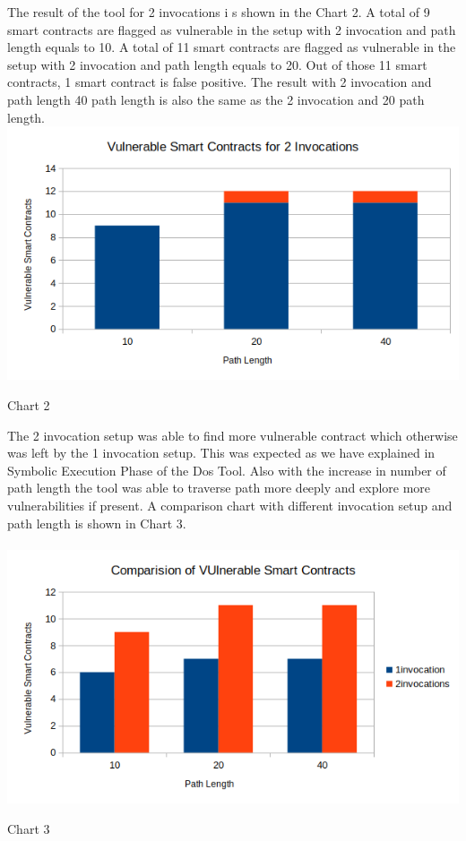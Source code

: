 \documentclass{article}
\begin{document}
The result of the tool for 2 invocations i s shown in the Chart 2. A total of 9 smart contracts are flagged as vulnerable in the setup with 2 invocation and path length equals to 10. A total of 11 smart contracts are flagged as vulnerable in the setup with 2 invocation and path length equals to 20. Out of those 11 smart contracts, 1 smart contract is false positive. The result with 2 invocation and path length 40 path length is also the same as the 2 invocation and 20 path length. 
\includegraphics[width = 15cm]{images/52.png}
\begin{center}
    Chart 2
\end{center}
The 2 invocation setup was able to find more vulnerable contract which otherwise was left by the 1 invocation setup. This was expected as we have explained in Symbolic Execution Phase of the Dos Tool. Also with the increase in number of path length the tool was able to traverse path more deeply and explore more vulnerabilities if present. A comparison chart with different invocation setup and path length is shown in Chart 3.\\
\\
\includegraphics[width= 16cm]{images/53.png}
\begin{center}
    Chart 3
\end{center}
\end{document}
